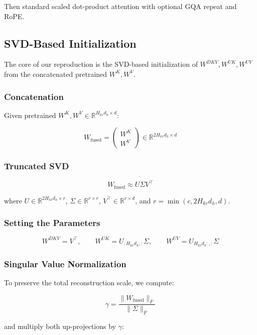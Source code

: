 Then standard scaled dot-product attention with optional GQA repeat and 
RoPE.

\subsection{SVD-Based Initialization}

The core of our reproduction is the SVD-based initialization of 
$W^{DKV}, W^{UK}, W^{UV}$ from the concatenated pretrained $W^K, W^V$.

\subsubsection{Concatenation}

Given pretrained $W^K, W^V \in \mathbb{R}^{H_{kv} d_h \times d}$:

\[
W_\text{fused} = \begin{pmatrix} W^K \\ W^V \end{pmatrix} \in \mathbb{R}^{2 H_{kv} d_h \times d}
\tag{4.2}
\]

\subsubsection{Truncated SVD}

\[
W_\text{fused} \approx U \Sigma V^\top
\tag{4.3}
\]

where $U \in \mathbb{R}^{2 H_{kv} d_h \times r}$, $\Sigma \in \mathbb{R}^{r \times r}$, 
$V^\top \in \mathbb{R}^{r \times d}$, and $r = \min(c, 2 H_{kv} d_h, d)$.

\subsubsection{Setting the Parameters}

\[
W^{DKV} = V^\top, \qquad
W^{UK} = U_{:H_{kv} d_h, :} \Sigma, \qquad
W^{UV} = U_{H_{kv} d_h:, :} \Sigma
\tag{4.4}
\]

\subsubsection{Singular Value Normalization}

To preserve the total reconstruction scale, we compute:

\[
\gamma = \frac{\|W_\text{fused}\|_F}{\|\Sigma\|_F}
\tag{4.5}
\]

and multiply both up-projections by $\gamma$:

